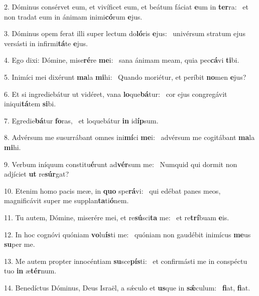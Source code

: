 2. Dóminus consérvet eum, et vivíficet eum, et beátum fáciat \textbf{e}um in \textbf{ter}ra: \ast\  et non tradat eum in ánimam inimi\textbf{có}rum \textbf{e}jus.\

3. Dóminus opem ferat illi super lectum do\textbf{ló}ris \textbf{e}jus: \ast\  univérsum stratum ejus versásti in infirmi\textbf{tá}te \textbf{e}jus.\

4. Ego dixi: Dómine, mise\textbf{ré}re \textbf{me}i: \ast\  sana ánimam meam, quia pec\textbf{cá}vi \textbf{ti}bi.\

5. Inimíci mei dixérunt \textbf{ma}la \textbf{mi}hi: \ast\  Quando moriétur, et períbit \textbf{no}men \textbf{e}jus?\

6. Et si ingrediebátur ut vidéret, vana \textbf{lo}que\textbf{bá}tur: \ast\  cor ejus congregávit iniqui\textbf{tá}tem \textbf{si}bi.\

7. Egredie\textbf{bá}tur \textbf{fo}ras, \ast\  et loquebátur \textbf{in} id\textbf{íp}sum.\

8. Advérsum me susurrábant omnes ini\textbf{mí}ci \textbf{me}i: \ast\  advérsum me cogitábant \textbf{ma}la \textbf{mi}hi.\

9. Verbum iníquum constitu\textbf{é}runt ad\textbf{vér}sum me: \ast\  Numquid qui dormit non adjíciet \textbf{ut} re\textbf{súr}gat?\

10. Etenim homo pacis meæ, in \textbf{quo} spe\textbf{rá}vi: \ast\  qui edébat panes meos, magnificávit super me supplan\textbf{ta}ti\textbf{ó}nem.\

11. Tu autem, Dómine, miserére mei, et re\textbf{sú}sci\textbf{ta} me: \ast\  et re\textbf{trí}buam \textbf{e}is.\

12. In hoc cognóvi quóniam \textbf{vo}lu\textbf{ís}ti me: \ast\  quóniam non gaudébit inimícus \textbf{me}us \textbf{su}per me.\

13. Me autem propter innocéntiam \textbf{su}sce\textbf{pís}ti: \ast\  et confirmásti me in conspéctu tuo \textbf{in} æ\textbf{tér}num.\

14. Benedíctus Dóminus, Deus Israël, a sǽculo et \textbf{us}que in \textbf{sǽ}culum: \ast\  \textbf{fi}at, \textbf{fi}at.\

